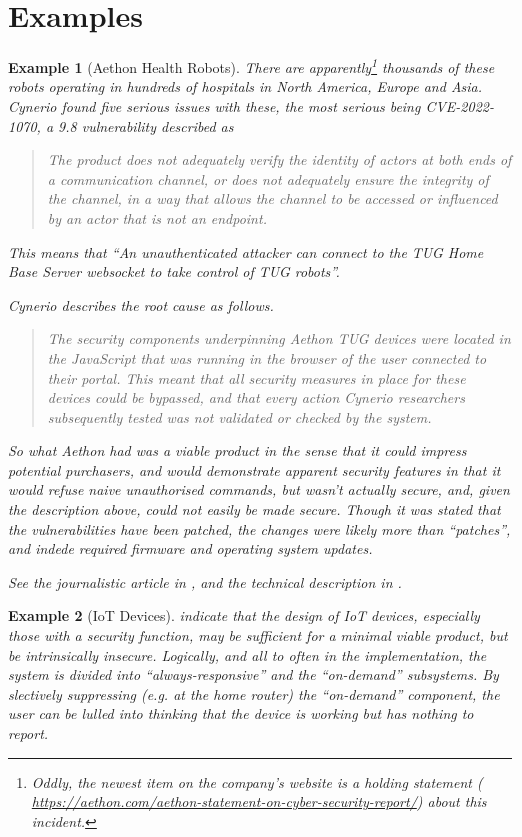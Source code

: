 \documentclass{article}
\newtheorem{example}{Example}
\begin{document}
\section{Examples}
\begin{example}[Aethon Health Robots]
\rm
There are apparently\footnote{Oddly, the newest item on the company's website is a holding statement ( \url{https://aethon.com/aethon-statement-on-cyber-security-report/}) about this incident.} thousands of these robots operating in hundreds of hospitals in North America, Europe and Asia. Cynerio found five serious issues with these, the most serious being CVE-2022-1070, a 9.8 vulnerability described as
\begin{quote}
The product does not adequately verify
the identity of actors at both ends of a
communication channel, or does not adequately
ensure the integrity of the channel, in a way
that allows the channel to be accessed or
influenced by an actor that is not an endpoint.
\end{quote}
This means that ``An unauthenticated attacker can
connect to the TUG Home Base
Server websocket to take control
of TUG robots''.
\par
Cynerio  describes the root cause as follows.
\begin{quote}
The security components underpinning Aethon TUG devices were
located in the JavaScript that was running in the browser of the user connected to their portal. This meant
that all security measures in place for these devices could be bypassed, and that every action Cynerio
researchers subsequently tested was not validated or checked by the system.
\end{quote}
So what Aethon had was a viable product in the sense that it could impress potential purchasers, and would demonstrate apparent security features in that it would refuse naive unauthorised commands, but wasn't actually secure, and, given the description above, could not easily be made secure.  Though it was stated that the vulnerabilities have been patched, the changes were likely more than ``patches'', and indede required firmware and operating system updates.
\par
See the journalistic article in \cite{Davis2022i}, and the technical description in \cite{Cynerio2022a}.
\end{example}
\begin{example}[IoT Devices]
\rm
\cite{OConnoretal2019a} indicate that the design of IoT devices, especially those with a security function, may be sufficient for a minimal viable product, but be intrinsically insecure. Logically, and all to often in the implementation, the system is divided into ``always-responsive'' and the ``on-demand'' subsystems. By slectively suppressing (e.g. at the home router) the ``on-demand'' component, the user can be lulled into thinking that the device is working but has nothing to report.
\end{example}
\end{document}
